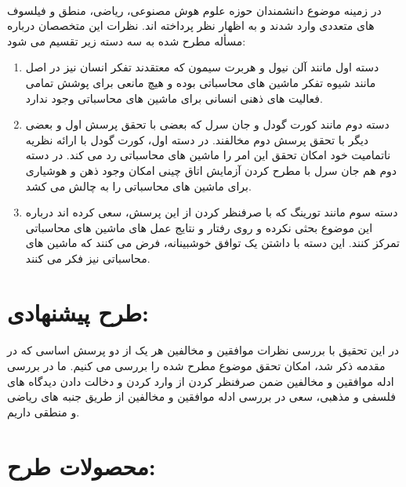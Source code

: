 \documentclass{report}
\begin{document}
\paragraph{} \hspace{0pt}
در زمینه موضوع دانشمندان حوزه علوم هوش مصنوعی، ریاضی، منطق و فیلسوف های متعددی وارد شدند و به اظهار نظر پرداخته اند. نظرات این متخصصان درباره مسأله مطرح شده به سه دسته زیر تقسیم می شود:
\begin{enumerate}
	\item   دسته اول مانند آلن نیول 
	و هربرت سیمون
	 که معتقدند تفکر انسان نیز در اصل مانند شیوه تفکر ماشین های محاسباتی بوده و هیچ مانعی برای پوشش تمامی فعالیت های ذهنی انسانی برای ماشین های محاسباتی وجود ندارد.
	\item   دسته دوم مانند کورت گودل 
	و جان سرل
	 که بعضی با تحقق پرسش اول و بعضی دیگر با تحقق پرسش دوم مخالفند.
	در دسته اول، کورت گودل با ارائه نظریه ناتمامیت خود امکان تحقق این امر را ماشین های محاسباتی رد می کند. در دسته دوم هم جان سرل با مطرح کردن آزمایش اتاق چینی امکان وجود ذهن و هوشیاری برای ماشین های محاسباتی را به چالش می کشد.
	\item  دسته سوم مانند تورینگ که با صرفنظر کردن از این پرسش، سعی کرده اند درباره این موضوع بحثی نکرده و روی رفتار و نتایج عمل های ماشین های محاسباتی تمرکز کنند. این دسته با داشتن یک توافق خوشبینانه، فرض می کنند که ماشین های محاسباتی نیز فکر می کنند.
\end{enumerate}


\section*{طرح پیشنهادی:}

\paragraph{} \hspace{0pt}
در این تحقیق با بررسی نظرات موافقین و مخالفین هر یک از دو پرسش اساسی که در مقدمه ذکر شد، امکان تحقق موضوع مطرح شده را بررسی می کنیم. ما در بررسی ادله موافقین و مخالفین ضمن صرفنظر کردن از وارد کردن و دخالت دادن دیدگاه های فلسفی و مذهبی، سعی در بررسی ادله موافقین و مخالفین از طریق جنبه های ریاضی و منطقی داریم.

\section*{محصولات طرح:}
\end{document}
